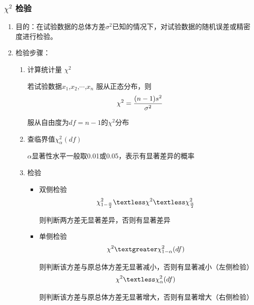 \documentclass[UTF8]{ctexart}
\begin{document}
\subsubsection{$\chi^2$ 检验}
\begin{enumerate}[•]
\item  目的：在试验数据的总体方差$\sigma ^2$已知的情况下，对试验数据的随机误差或精密度进行检验。
\item 检验步骤：
  \begin{enumerate}[1.]
  \item 计算统计量 $\chi^2$
  \par 若试验数据$x_1$,$x_2$,$\cdots $,$x_n$ 服从正态分布，则
     \begin{equation}\notag
     \chi^{2}=\frac{(n-1)s^2}{\sigma ^2}
     \end{equation}
  \par 服从自由度为$df=n-1$的$\chi^2$分布
  \item 查临界值$\chi^{2}_{\alpha}(df)$
  \par $\alpha$显著性水平一般取0.01或0.05，表示有显著差异的概率
  \item 检验
    \begin{itemize}
    \item 双侧检验
      \begin{equation}\notag
      \chi^{2}_{1-\frac{\alpha}{2}}\textless\chi^{2}\textless\chi^{2}_{\frac{\alpha}{2}}
      \end{equation}
      \par \quad 则判断两方差无显著差异，否则有显著差异
    \item 单侧检验
      \begin{equation}\notag
      \chi^{2}\textgreater\chi^{2}_{1-\alpha}(df)
      \end{equation}
      \par \quad 则判断该方差与原总体方差无显著减小，否则有显著减小（左侧检验）
      \begin{equation}\notag
      \chi^{2}\textless\chi^{2}_{\alpha}(df)
      \end{equation}
      \par \quad 则判断该方差与原总体方差无显著增大，否则有显著增大（右侧检验）
    \end{itemize} 
  \end{enumerate}
\end{enumerate}
\end{document}
